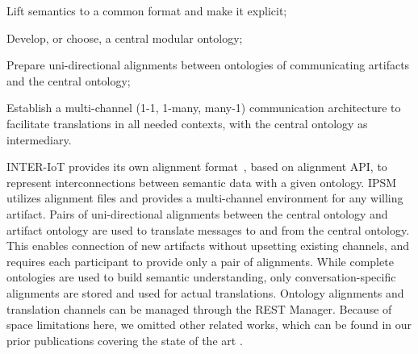 \documentclass{sig-alternate-05-2015}
\begin{document}
\begin{enumerate*}[label=\roman*)]
\item Lift semantics to a common format and make it explicit\cite{Ganzha2017a};
\item Develop, or choose, a central modular ontology;
\item Prepare uni-directional alignments between ontologies of communicating artifacts and the central ontology;
\item Establish a multi-channel (1-1, 1-many, many-1) communication architecture to facilitate translations in all needed contexts, with the central ontology as intermediary.
\end{enumerate*}


INTER-IoT provides its own alignment format~\cite{Pawlowski2017}, based on alignment API, to represent interconnections between semantic data with a given ontology. IPSM utilizes alignment files and provides a multi-channel environment for any willing artifact. Pairs of uni-directional alignments between the central ontology and artifact ontology are used to translate messages to and from the central ontology. This enables connection of new artifacts without upsetting existing channels, and requires each participant to provide only a pair of alignments. While complete ontologies are used to build semantic understanding, only conversation-specific alignments are stored and used for actual translations. Ontology alignments and translation channels can be managed through the REST Manager. Because of space limitations here, we omitted other related works, which can be found in our prior publications covering the state of the art \cite{Ganzha2017a,Ganzha2016a,Ganzha2015,Ganzha2016}.

\end{document}
